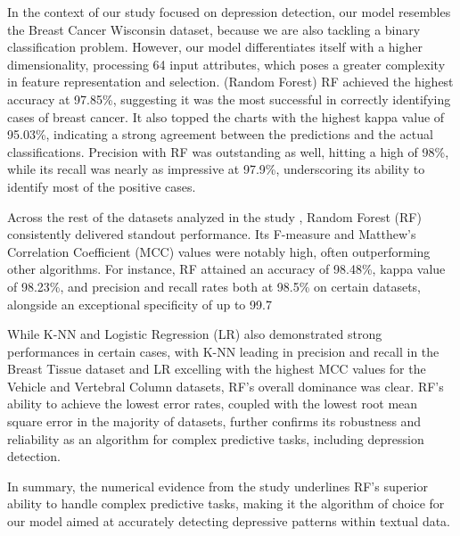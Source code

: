 In the context of our study focused on depression detection, our model resembles the Breast Cancer Wisconsin dataset, because we are also tackling a binary classification problem. However, our model differentiates itself with a higher dimensionality, processing 64 input attributes, which poses a greater complexity in feature representation and selection. (Random Forest) RF achieved the highest accuracy at 97.85\%, suggesting it was the most successful in correctly identifying cases of breast cancer. It also topped the charts with the highest kappa value of 95.03\%, indicating a strong agreement between the predictions and the actual classifications. Precision with RF was outstanding as well, hitting a high of 98\%, while its recall was nearly as impressive at 97.9\%, underscoring its ability to identify most of the positive cases. 

Across the rest of the datasets analyzed in the study \cite{siraj2023performanceModelComparison}, Random Forest (RF) consistently delivered standout performance. Its F-measure and Matthew's Correlation Coefficient (MCC) values were notably high, often outperforming other algorithms. For instance, RF attained an accuracy of 98.48\%, kappa value of 98.23\%, and precision and recall rates both at 98.5\% on certain datasets, alongside an exceptional specificity of up to 99.7%

While K-NN and Logistic Regression (LR) also demonstrated strong performances in certain cases, with K-NN leading in precision and recall in the Breast Tissue dataset and LR excelling with the highest MCC values for the Vehicle and Vertebral Column datasets, RF's overall dominance was clear. RF's ability to achieve the lowest error rates, coupled with the lowest root mean square error in the majority of datasets, further confirms its robustness and reliability as an algorithm for complex predictive tasks, including depression detection.

In summary, the numerical evidence from the study \cite{siraj2023performanceModelComparison} underlines RF's superior ability to handle complex predictive tasks, making it the algorithm of choice for our model aimed at accurately detecting depressive patterns within textual data.


